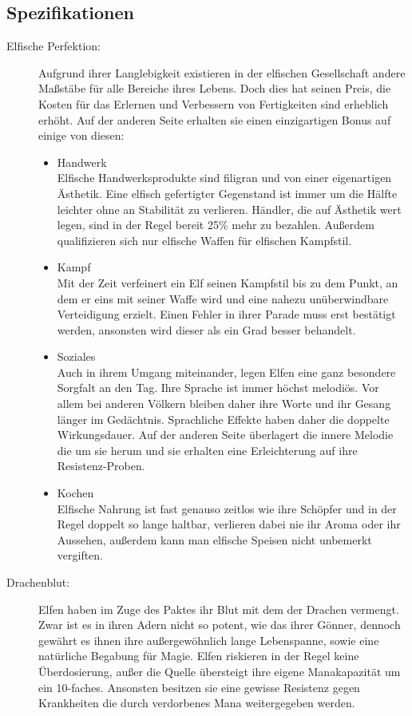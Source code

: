 \documentclass[a4paper,12pt,oneside]{book}
\begin{document}
\subsection{Spezifikationen}
\begin{description}
\item[Elfische Perfektion:]
Aufgrund ihrer Langlebigkeit existieren in der elfischen Gesellschaft andere Maßstäbe für alle Bereiche ihres Lebens. Doch dies hat seinen Preis, die Kosten für das Erlernen und Verbessern von Fertigkeiten sind erheblich erhöht. Auf der anderen Seite erhalten sie einen einzigartigen Bonus auf einige von diesen:
\begin{itemize}
\item{Handwerk}
\\Elfische Handwerksprodukte sind filigran und von einer eigenartigen Ästhetik. Eine elfisch gefertigter Gegenstand ist immer um die Hälfte leichter ohne an Stabilität zu verlieren. Händler, die auf Ästhetik wert legen, sind in der Regel bereit 25\% mehr zu bezahlen. Außerdem qualifizieren sich nur elfische Waffen für elfischen Kampfstil.
\item{Kampf}
\\Mit der Zeit verfeinert ein Elf seinen Kampfstil bis zu dem Punkt, an dem er eins mit seiner Waffe wird und eine nahezu unüberwindbare Verteidigung erzielt. Einen Fehler in ihrer Parade muss erst bestätigt werden, ansonsten wird dieser als ein Grad besser behandelt.
\item{Soziales}
\\Auch in ihrem Umgang miteinander, legen Elfen eine ganz besondere Sorgfalt an den Tag. Ihre Sprache ist immer höchst melodiös. Vor allem bei anderen Völkern bleiben daher ihre Worte und ihr Gesang länger im Gedächtnis. Sprachliche Effekte haben daher die doppelte Wirkungsdauer. Auf der anderen Seite überlagert die innere Melodie die um sie herum und sie erhalten eine Erleichterung auf ihre Resistenz-Proben.
\item{Kochen}
\\Elfische Nahrung ist fast genauso zeitlos wie ihre Schöpfer und in der Regel doppelt so lange haltbar, verlieren dabei nie ihr Aroma oder ihr Aussehen, außerdem kann man elfische Speisen nicht unbemerkt vergiften.
\end{itemize}
\item[Drachenblut:]
Elfen haben im Zuge des Paktes ihr Blut mit dem der Drachen vermengt. Zwar ist es in ihren Adern nicht so potent, wie das ihrer Gönner, dennoch gewährt es ihnen ihre außergewöhnlich lange Lebenspanne, sowie eine natürliche Begabung für Magie. Elfen riskieren in der Regel keine Überdosierung, außer die Quelle übersteigt ihre eigene Manakapazität um ein 10-faches. Ansonsten besitzen sie eine gewisse Resistenz gegen Krankheiten die durch verdorbenes Mana weitergegeben werden.
\end{description}
\end{document}
